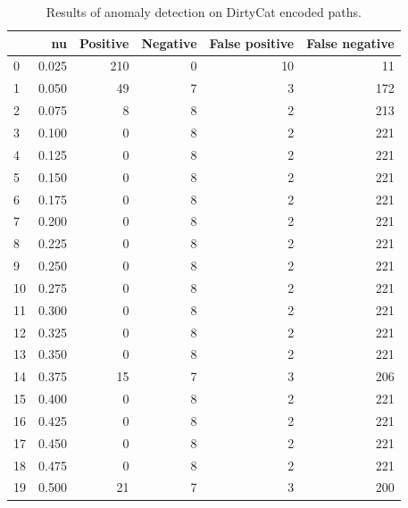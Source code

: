 \documentclass[a4paper,twoside,12pt]{book}
\begin{document}
\begin{appendices}
\begin{table}
	\centering
	\caption{Results of anomaly detection on DirtyCat encoded paths.}
	\label{id:tab:ocsvmOnDirtyCatBad}
	\begin{tabular}{lrrrrr}
		\toprule
		{} &     nu &  Positive &  Negative &  False positive &  False negative \\
		\midrule
		0  &  0.025 &       210 &         0 &              10 &              11 \\
		1  &  0.050 &        49 &         7 &               3 &             172 \\
		2  &  0.075 &         8 &         8 &               2 &             213 \\
		3  &  0.100 &         0 &         8 &               2 &             221 \\
		4  &  0.125 &         0 &         8 &               2 &             221 \\
		5  &  0.150 &         0 &         8 &               2 &             221 \\
		6  &  0.175 &         0 &         8 &               2 &             221 \\
		7  &  0.200 &         0 &         8 &               2 &             221 \\
		8  &  0.225 &         0 &         8 &               2 &             221 \\
		9  &  0.250 &         0 &         8 &               2 &             221 \\
		10 &  0.275 &         0 &         8 &               2 &             221 \\
		11 &  0.300 &         0 &         8 &               2 &             221 \\
		12 &  0.325 &         0 &         8 &               2 &             221 \\
		13 &  0.350 &         0 &         8 &               2 &             221 \\
		14 &  0.375 &        15 &         7 &               3 &             206 \\
		15 &  0.400 &         0 &         8 &               2 &             221 \\
		16 &  0.425 &         0 &         8 &               2 &             221 \\
		17 &  0.450 &         0 &         8 &               2 &             221 \\
		18 &  0.475 &         0 &         8 &               2 &             221 \\
		19 &  0.500 &        21 &         7 &               3 &             200 \\

\end{tabular}
\end{table}
\end{appendices}
\end{document}

